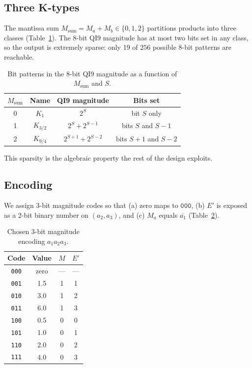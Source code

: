 \documentclass[11pt]{article}
\begin{document}
\subsection{Three K-types}

The mantissa sum $M_{\text{sum}} = M_a + M_b \in \{0,1,2\}$ partitions
products into three classes (Table~\ref{tab:ktypes}).
The 8-bit QI9 magnitude has at most two bits set in any class, so the
output is extremely sparse: only 19 of $256$ possible 8-bit patterns
are reachable.

\begin{table}[h!]
  \centering
  \caption{Bit patterns in the 8-bit QI9 magnitude as a function of
    $M_{\text{sum}}$ and $S$.}
  \label{tab:ktypes}
  \begin{tabular}{cccc}
    \toprule
    $M_{\text{sum}}$ & Name & QI9 magnitude & Bits set \\
    \midrule
    0 & $K_1$     & $2^S$                  & bit $S$ only \\
    1 & $K_{3/2}$ & $2^S + 2^{S-1}$        & bits $S$ and $S-1$ \\
    2 & $K_{9/4}$ & $2^{S+1} + 2^{S-2}$    & bits $S{+}1$ and $S{-}2$ \\
    \bottomrule
  \end{tabular}
\end{table}

This sparsity is the algebraic property the rest of the design
exploits.

\subsection{Encoding}

We assign 3-bit magnitude codes so that (a) zero maps to
$\texttt{000}$, (b) $E'$ is exposed as a 2-bit binary number on
$(a_2,a_3)$, and (c) $M_a$ equals $\overline{a_1}$
(Table~\ref{tab:encoding}).

\begin{table}[h!]
  \centering
  \caption{Chosen 3-bit magnitude encoding $a_1 a_2 a_3$.}
  \label{tab:encoding}
  \begin{tabular}{cccc}
    \toprule
    Code & Value & $M$ & $E'$ \\
    \midrule
    \texttt{000} & zero & --- & --- \\
    \texttt{001} & 1.5  & 1   & 1 \\
    \texttt{010} & 3.0  & 1   & 2 \\
    \texttt{011} & 6.0  & 1   & 3 \\
    \texttt{100} & 0.5  & 0   & 0 \\
    \texttt{101} & 1.0  & 0   & 1 \\
    \texttt{110} & 2.0  & 0   & 2 \\
    \texttt{111} & 4.0  & 0   & 3 \\
    \bottomrule
  \end{tabular}
\end{table}
\end{document}
